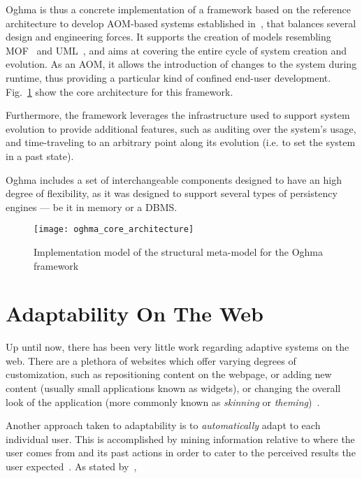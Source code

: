 Oghma is thus a concrete implementation of a framework based on the reference architecture to develop AOM-based systems established in~\cite{ferreira_phd_2010}, that balances several design and engineering forces. It supports the creation of models resembling MOF~\cite{mof} and UML~\cite{uml}, and aims at covering the entire cycle of system creation and evolution. As an AOM, it allows the introduction of changes to the system during runtime, thus providing a particular kind of confined end-user development. Fig.~\ref{fig:oghma_core_architecture} show the core architecture for this framework.

Furthermore, the framework leverages the infrastructure used to support system evolution to provide additional features, such as auditing over the system’s usage, and time-traveling to an arbitrary point along its evolution (i.e. to set the system in a past state).

Oghma includes a set of interchangeable components designed to have an high degree of flexibility, as it was designed to support several types of persistency engines --- be it in memory or a DBMS.

\begin{figure}[H]
  \centering
  \texttt{[image: oghma\_core\_architecture]}
  \caption{Implementation model of the structural meta-model for the Oghma framework}
  \label{fig:oghma_core_architecture}
\end{figure}

\section{Adaptability On The Web}\label{sec:web_adaptability}

Up until now, there has been very little work regarding adaptive systems on the web. There are a plethora of websites which offer varying degrees of customization, such as repositioning content on the webpage, or adding new content (usually small applications known as widgets), or changing the overall look of the application (more commonly known as \emph{skinning} or \emph{theming})~\cite{igoogle, pageflakes, protopage, webwag}.

Another approach taken to adaptability is to \emph{automatically} adapt to each individual user. This is accomplished by mining information relative to where the user comes from and its past actions in order to cater to the perceived results the user expected~\cite{GGGR09}. As stated by~\cite{NC}, 

